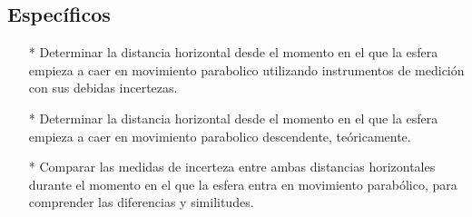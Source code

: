 \documentclass[osajnl,twocolumn,showpacs,superscriptaddress,10pt]{revtex4-1}
\begin{document}
\subsection{Específicos}
\begin{itemize}
\item[*] Determinar la distancia horizontal desde el momento en el que la esfera empieza a caer en movimiento parabolico utilizando instrumentos de medición con sus debidas incertezas.
\item[*] Determinar la distancia horizontal desde el momento en el que la esfera empieza a caer en movimiento parabolico descendente, teóricamente.
\item[*] Comparar las medidas de incerteza entre ambas distancias horizontales durante el momento en el que la esfera entra en movimiento parabólico, para comprender las diferencias y similitudes.
\end{itemize}
 
\end{document}
